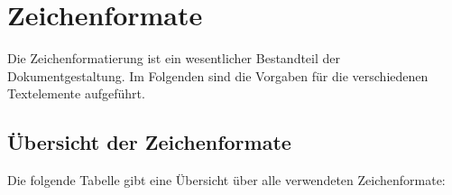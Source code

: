 
\chapter{Zeichenformate}
\label{chap:zeichenformate}

Die Zeichenformatierung ist ein wesentlicher Bestandteil der Dokumentgestaltung. Im Folgenden sind die Vorgaben für die verschiedenen Textelemente aufgeführt.

\section{Übersicht der Zeichenformate}
\label{sec:zeichenformate_uebersicht}

Die folgende Tabelle gibt eine Übersicht über alle verwendeten Zeichenformate:


